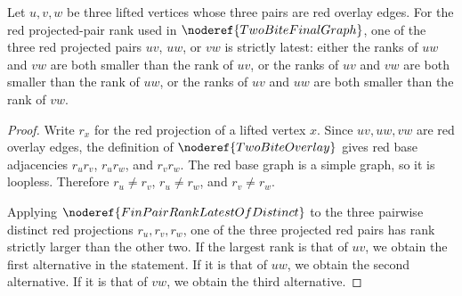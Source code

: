 \begin{helper}
Let \(u,v,w\) be three lifted vertices whose three pairs are red overlay edges.
For the red projected-pair rank used in \(\noderef{TwoBiteFinalGraph}\), one of
the three red projected pairs \(uv\), \(uw\), or \(vw\) is strictly latest:
either the ranks of \(uw\) and \(vw\) are both smaller than the rank of \(uv\),
or the ranks of \(uv\) and \(vw\) are both smaller than the rank of \(uw\), or
the ranks of \(uv\) and \(uw\) are both smaller than the rank of \(vw\).
\end{helper}
\begin{proof}
Write \(r_x\) for the red projection of a lifted vertex \(x\).  Since
\(uv,uw,vw\) are red overlay edges, the definition of
\(\noderef{TwoBiteOverlay}\) gives red base adjacencies
\(r_ur_v\), \(r_ur_w\), and \(r_vr_w\).  The red base graph is a simple graph,
so it is loopless.  Therefore \(r_u\ne r_v\), \(r_u\ne r_w\), and
\(r_v\ne r_w\).

Applying \(\noderef{FinPairRankLatestOfDistinct}\) to the three pairwise
distinct red projections \(r_u,r_v,r_w\), one of the three projected red pairs
has rank strictly larger than the other two.  If the largest rank is that of
\(uv\), we obtain the first alternative in the statement.  If it is that of
\(uw\), we obtain the second alternative.  If it is that of \(vw\), we obtain
the third alternative.
\end{proof}
